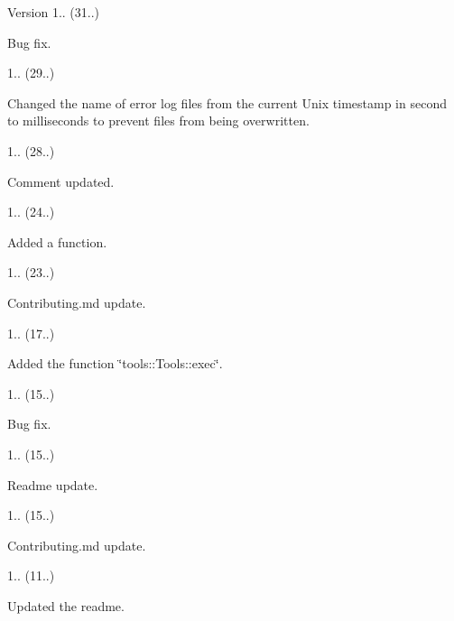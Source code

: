 \begin{DoxyVersion}{Version}
1.. (31..)
\begin{DoxyItemize}
\item Bug fix. 
\end{DoxyItemize}

1.. (29..)
\begin{DoxyItemize}
\item Changed the name of error log files from the current Unix timestamp in second to milliseconds to prevent files from being overwritten. 
\end{DoxyItemize}

1.. (28..)
\begin{DoxyItemize}
\item Comment updated. 
\end{DoxyItemize}

1.. (24..)
\begin{DoxyItemize}
\item Added a function. 
\end{DoxyItemize}

1.. (23..)
\begin{DoxyItemize}
\item Contributing.\+md update. 
\end{DoxyItemize}

1.. (17..)
\begin{DoxyItemize}
\item Added the function \char`\"{}tools\+::\+Tools\+::exec\char`\"{}. 
\end{DoxyItemize}

1.. (15..)
\begin{DoxyItemize}
\item Bug fix. 
\end{DoxyItemize}

1.. (15..)
\begin{DoxyItemize}
\item Readme update. 
\end{DoxyItemize}

1.. (15..)
\begin{DoxyItemize}
\item Contributing.\+md update. 
\end{DoxyItemize}

1.. (11..)
\begin{DoxyItemize}
\item Updated the readme. 
\end{DoxyItemize}


\end{DoxyVersion}
